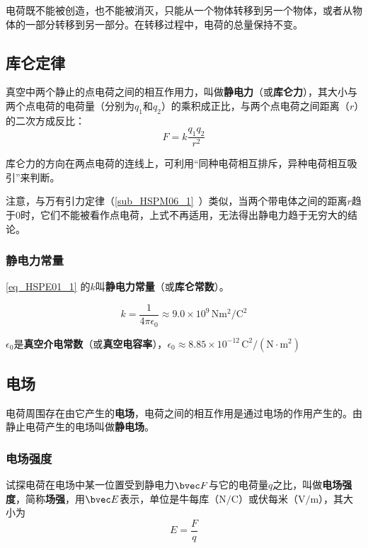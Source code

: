 电荷既不能被创造，也不能被消灭，只能从一个物体转移到另一个物体，或者从物体的一部分转移到另一部分。在转移过程中，电荷的总量保持不变。

\subsection{库仑定律}

真空中两个静止的点电荷之间的相互作用力，叫做\textbf{静电力}（或\textbf{库仑力}），其大小与两个点电荷的电荷量（分别为$q_1$和$q_2$）的乘积成正比，与两个点电荷之间距离（$r$）的二次方成反比：
\begin{equation}\label{eq_HSPE01_1}
F=k \frac{q_1 q_2}{r^2}
\end{equation}

库仑力的方向在两点电荷的连线上，可利用“同种电荷相互排斥，异种电荷相互吸引”来判断。

注意，与万有引力定律（\autoref{sub_HSPM06_1}~）类似，当两个带电体之间的距离$r$趋于$0$时，它们不能被看作点电荷，上式不再适用，无法得出静电力趋于无穷大的结论。

\subsubsection{静电力常量}

\autoref{eq_HSPE01_1} 的$k$叫\textbf{静电力常量}（或\textbf{库仑常数}）。

\begin{equation}\label{eq_HSPE01_8}
k = \frac{1}{4\pi\epsilon_0} \approx 9.0 \times 10^{9} \,\mathrm{N m^2/C^2}
\end{equation}

$\epsilon_0$是\textbf{真空介电常数}（或\textbf{真空电容率}），$\epsilon_0 \approx 8.85 \times 10^{-12}  \,\mathrm{C^2/(N \cdot m^2)}$

\subsection{电场}

电荷周围存在由它产生的\textbf{电场}，电荷之间的相互作用是通过电场的作用产生的。由静止电荷产生的电场叫做\textbf{静电场}。

\subsubsection{电场强度}

试探电荷在电场中某一位置受到静电力$\bvec F$与它的电荷量$q$之比，叫做\textbf{电场强度}，简称\textbf{场强}，用$\bvec E$表示，单位是牛每库（$\mathrm{N/C}$）或伏每米（$\mathrm{V/m}$），其大小为
\begin{equation}\label{eq_HSPE01_2}
E =\frac {F}{q}
\end{equation}

